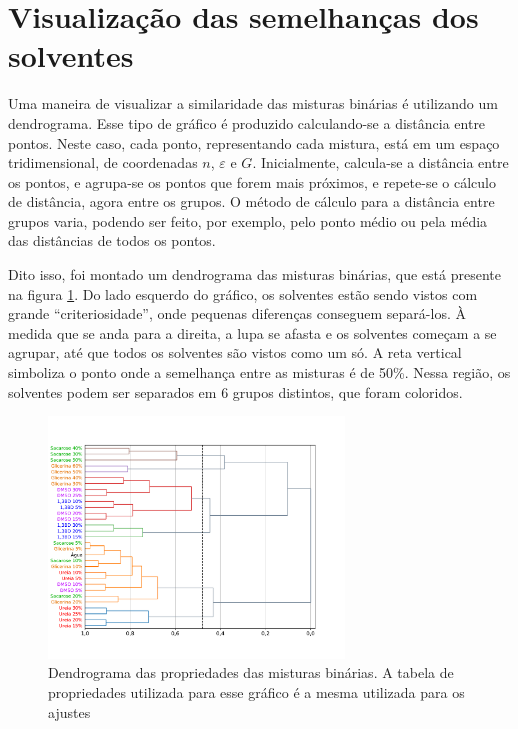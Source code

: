 		
		\FloatBarrier
		
		\section{Visualização das semelhanças dos solventes}
		
		Uma maneira de visualizar a similaridade das misturas binárias é utilizando um dendrograma. Esse tipo de gráfico é produzido calculando-se a distância entre pontos. Neste caso, cada ponto, representando cada mistura, está em um espaço tridimensional, de coordenadas \(n\), \(\varepsilon\) e \(G\). Inicialmente, calcula-se a distância entre os pontos, e agrupa-se os pontos que forem mais próximos, e repete-se o cálculo de distância, agora entre os grupos. O método de cálculo para a distância entre grupos varia, podendo ser feito, por exemplo, pelo ponto médio ou pela média das distâncias de todos os pontos. %
		
		Dito isso, foi montado um dendrograma das misturas binárias, que está presente na figura \ref{fig:dendrograma}. Do lado esquerdo do gráfico, os solventes estão sendo vistos com grande ``criteriosidade'', onde pequenas diferenças conseguem separá-los. À medida que se anda para a direita, a lupa se afasta e os solventes começam a se agrupar, até que todos os solventes são vistos como um só. A reta vertical simboliza o ponto onde a semelhança entre as misturas é de 50\%. Nessa região, os solventes podem ser separados em 6 grupos distintos, que foram coloridos.
		
		\begin{figure}[h]
			\centering
			\includegraphics[width=0.7\textwidth]{imagens/propriedades/dendrograma}
			\caption{Dendrograma das propriedades das misturas binárias. A tabela de propriedades utilizada para esse gráfico é a mesma utilizada para os ajustes}
			\label{fig:dendrograma}
		\end{figure}
		
